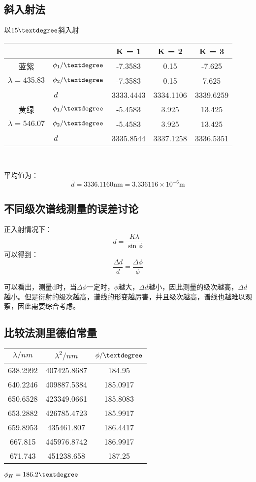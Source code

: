 \documentclass[10pt,a4paper,nocap]{ctexart}
\begin{document}
		\subsection{斜入射法}
		以\(15\textdegree\)斜入射
	\begin{center}
			\begin{tabular}{ |c |c| c| c| c| }\hline
			 \multicolumn{2}{|c|}{} & K = 1	& K = 2	& K = 3\\ \hline
			蓝紫&\(\phi_1/\textdegree\) & -7.3583	& 0.15 & -7.625  \\ \cline{2-5}
		\(\lambda = 435.83\) &\(\phi_2/\textdegree\) &-7.3583 & 0.15 & 7.625 \\ \hline 
		\multicolumn{2}{|c|}{\(d\)} & 3333.4443 & 3334.1106 & 3339.6259 \\ \hline
		黄绿&\(\phi_1/\textdegree\) & -5.4583	& 3.925 & 13.425  \\ \cline{2-5}
		 \(\lambda = 546.07\)& \(\phi_2/\textdegree\) &-5.4583 & 3.925 & 13.425 \\ \hline 
		\multicolumn{2}{|c|}{\(d\)} & 3335.8544 & 3337.1258 & 3336.5351 \\ \hline
		\end{tabular}\\
	\end{center}
		平均值为：
			\[\bar{d} = 3336.1160 \mathrm{nm} = 3.336116 \times10^{-6} \mathrm{m}\]
	\subsection{ 不同级次谱线测量的误差讨论}
			正入射情况下：\[d = \frac{K\lambda}{\sin\phi}\]
			可以得到：\[\frac{\Delta d}{d} = \frac{\Delta\phi}{\phi}\]
			
			可以看出，测量d时，当\(\Delta\phi\)一定时，\(\phi\)越大，\(\Delta d\)越小，因此测量的级次越高，\(\Delta d\)越小。但是衍射的级次越高，谱线的形变越厉害，并且级次越高，谱线也越难以观察，因此需要综合考虑。
	\subsection{比较法测里德伯常量}
	\begin{center}
		\begin{tabular}{|c|c|c|}\hline
			\(\lambda/nm\)	& \(\lambda^2/nm\) & \(\phi/\textdegree\)	\\ \hline
			638.2992 & 407425.8687 & 184.95	\\ \hline
			640.2246 & 409887.5384 & 185.0917 \\ \hline
			650.6528 & 423349.0661 & 185.8083 \\ \hline
			653.2882 & 426785.4723 & 185.9917 \\ \hline
			659.8953 & 435461.807 &	186.4417 \\ \hline
			667.815	 & 445976.8742 & 186.9917 \\ \hline
			671.743	 & 451238.658 & 187.25 \\ \hline
	\end{tabular}
	\end{center}
	\( \phi_H = 186.2\textdegree \)
\end{document}
